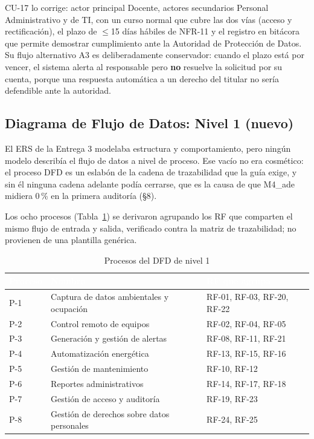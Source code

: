 CU-17 lo corrige: actor principal Docente, actores secundarios Personal Administrativo y de TI, con un curso normal que cubre las dos v\'ias (acceso y rectificaci\'on), el plazo de $\leq$15 d\'ias h\'abiles de NFR-11 y el registro en bit\'acora que permite demostrar cumplimiento ante la Autoridad de Protecci\'on de Datos. Su flujo alternativo A3 es deliberadamente conservador: cuando el plazo est\'a por vencer, el sistema alerta al responsable pero \textbf{no} resuelve la solicitud por su cuenta, porque una respuesta autom\'atica a un derecho del titular no ser\'ia defendible ante la autoridad.

\subsection{Diagrama de Flujo de Datos: Nivel 1 (nuevo)}

El ERS de la Entrega 3 modelaba estructura y comportamiento, pero ning\'un modelo describ\'ia el flujo de datos a nivel de proceso. Ese vac\'io no era cosm\'etico: el proceso DFD es un eslab\'on de la cadena de trazabilidad que la gu\'ia exige, y sin \'el ninguna cadena adelante pod\'ia cerrarse, que es la causa de que M4\_ade midiera 0\,\% en la primera auditor\'ia (\S8).

Los ocho procesos (Tabla~\ref{tab:dfd-procesos}) se derivaron agrupando los RF que comparten el mismo flujo de entrada y salida, verificado contra la matriz de trazabilidad; no provienen de una plantilla gen\'erica.

\begin{table}[H]
\centering
\small
\begin{tabular}{|l|p{5.5cm}|p{5.2cm}|}
\hline
\cellcolor{sigagreen}\textcolor{white}{\textbf{Proceso}} & \cellcolor{sigagreen}\textcolor{white}{\textbf{Nombre}} & \cellcolor{sigagreen}\textcolor{white}{\textbf{RF que agrupa}} \\ \hline
P-1 & Captura de datos ambientales y ocupaci\'on & RF-01, RF-03, RF-20, RF-22 \\ \hline
P-2 & Control remoto de equipos & RF-02, RF-04, RF-05 \\ \hline
P-3 & Generaci\'on y gesti\'on de alertas & RF-08, RF-11, RF-21 \\ \hline
P-4 & Automatizaci\'on energ\'etica & RF-13, RF-15, RF-16 \\ \hline
P-5 & Gesti\'on de mantenimiento & RF-10, RF-12 \\ \hline
P-6 & Reportes administrativos & RF-14, RF-17, RF-18 \\ \hline
P-7 & Gesti\'on de acceso y auditor\'ia & RF-19, RF-23 \\ \hline
P-8 & Gesti\'on de derechos sobre datos personales & RF-24, RF-25 \\ \hline
\end{tabular}
\caption{Procesos del DFD de nivel 1}
\label{tab:dfd-procesos}
\end{table}

